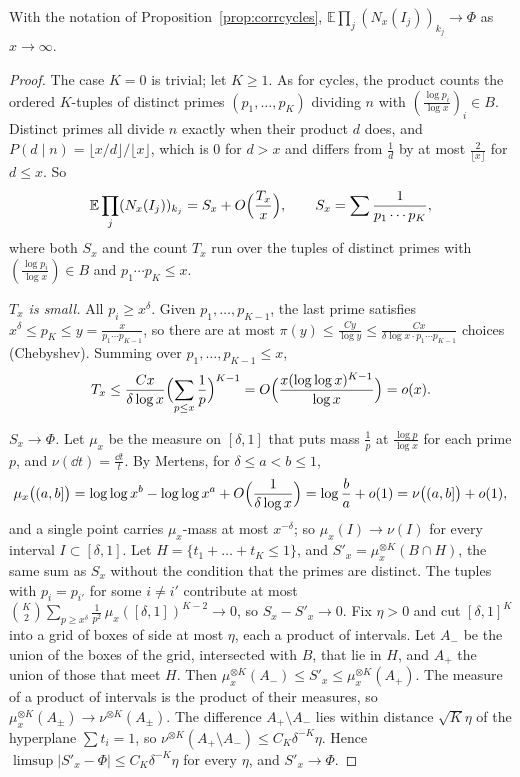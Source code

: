 \begin{proposition}\label{prop:corrprimes}
With the notation of Proposition~\ref{prop:corrcycles}, $\mathbb E\prod_j(N_x(I_j))_{k_j}\to\Phi$ as $x\to\infty$.
\end{proposition}
\begin{proof}
The case $K=0$ is trivial; let $K\ge1$. As for cycles, the product counts the ordered $K$-tuples of distinct primes $(p_1,\dots,p_K)$ dividing $n$ with $(\frac{\log p_i}{\log x})_i\in B$. Distinct primes all divide $n$ exactly when their product $d$ does, and
$P(d\mid n)=\lfloor x/d\rfloor/\lfloor x\rfloor$, which is $0$ for $d>x$ and differs from $\frac1d$ by at most $\frac2{\lfloor x\rfloor}$ for $d\le x$. So
\[
\mathbb E\prod_j(N_x(I_j))_{k_j}=S_x+O\Bigl(\frac{T_x}x\Bigr),\qquad S_x=\sum\frac1{p_1\cdots p_K},
\]
where both $S_x$ and the count $T_x$ run over the tuples of distinct primes with $(\frac{\log p_i}{\log x})\in B$ and $p_1\cdots p_K\le x$.

\emph{$T_x$ is small.} All $p_i\ge x^\delta$. Given $p_1,\dots,p_{K-1}$, the last prime satisfies $x^\delta\le p_K\le y=\frac x{p_1\cdots p_{K-1}}$, so there are at most $\pi(y)\le\frac{Cy}{\log y}\le\frac{Cx}{\delta\log x\cdot p_1\cdots p_{K-1}}$ choices (Chebyshev). Summing over $p_1,\dots,p_{K-1}\le x$,
\[
T_x\le\frac{Cx}{\delta\log x}\Bigl(\sum_{p\le x}\frac1p\Bigr)^{K-1}=O\Bigl(\frac{x(\log\log x)^{K-1}}{\log x}\Bigr)=o(x).
\]

\emph{$S_x\to\Phi$.} Let $\mu_x$ be the measure on $[\delta,1]$ that puts mass $\frac1p$ at $\frac{\log p}{\log x}$ for each prime $p$, and $\nu(\dd t)=\frac{\dd t}t$. By Mertens, for $\delta\le a<b\le1$,
\[
\mu_x\bigl((a,b]\bigr)=\log\log x^b-\log\log x^a+O\Bigl(\frac1{\delta\log x}\Bigr)=\log\frac ba+o(1)=\nu\bigl((a,b]\bigr)+o(1),
\]
and a single point carries $\mu_x$-mass at most $x^{-\delta}$; so $\mu_x(I)\to\nu(I)$ for every interval $I\subset[\delta,1]$. Let $H=\{t_1+\dots+t_K\le1\}$, and $S'_x=\mu_x^{\otimes K}(B\cap H)$, the same sum as $S_x$ without the condition that the primes are distinct. The tuples with $p_i=p_{i'}$ for some
$i\ne i'$ contribute at most $\binom K2\sum_{p\ge x^\delta}\frac1{p^2}\,\mu_x([\delta,1])^{K-2}\to0$, so $S_x-S'_x\to0$. Fix $\eta>0$ and cut $[\delta,1]^K$ into a grid of boxes of side at most $\eta$, each a product of intervals. Let $A_-$ be the union of the boxes of the grid, intersected with $B$, that lie in $H$, and $A_+$
the union of those that meet $H$. Then $\mu_x^{\otimes K}(A_-)\le S'_x\le\mu_x^{\otimes K}(A_+)$. The measure of a product of intervals is the product of their measures, so $\mu_x^{\otimes K}(A_\pm)\to\nu^{\otimes K}(A_\pm)$. The difference $A_+\setminus A_-$ lies within distance $\sqrt K\eta$ of the hyperplane
$\sum t_i=1$, so $\nu^{\otimes K}(A_+\setminus A_-)\le C_K\delta^{-K}\eta$. Hence $\limsup|S'_x-\Phi|\le C_K\delta^{-K}\eta$ for every $\eta$, and $S'_x\to\Phi$.
\end{proof}

